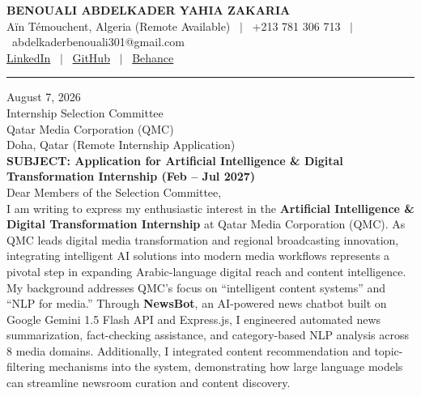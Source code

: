 \documentclass[11pt, letterpaper]{article}
\begin{document}
\RaggedRight

\begin{center}
  {\Large \textbf{BENOUALI ABDELKADER YAHIA ZAKARIA}}\\[4pt]
  Aïn Témouchent, Algeria (Remote Available) \ $|$ \ +213 781 306 713 \ $|$ \ abdelkaderbenouali301@gmail.com\\
  \href{https://www.linkedin.com/in/benouali-abdelkader-yahia-zakaria-4a917a247}{LinkedIn} \ $|$ \ \href{https://github.com/benoualiabdelkader}{GitHub} \ $|$ \ \href{https://www.behance.net/abdelkaderbeno}{Behance}
\end{center}

\vspace{6pt}
\hrule
\vspace{14pt}

\noindent August 7, 2026\\[10pt]
\noindent Internship Selection Committee\\
\noindent Qatar Media Corporation (QMC)\\
\noindent Doha, Qatar (Remote Internship Application)\\[12pt]

\noindent \textbf{SUBJECT: Application for Artificial Intelligence \& Digital Transformation Internship (Feb -- Jul 2027)}\\[12pt]

\noindent Dear Members of the Selection Committee,\\[10pt]

I am writing to express my enthusiastic interest in the \textbf{Artificial Intelligence \& Digital Transformation Internship} at Qatar Media Corporation (QMC). As QMC leads digital media transformation and regional broadcasting innovation, integrating intelligent AI solutions into modern media workflows represents a pivotal step in expanding Arabic-language digital reach and content intelligence.\\[10pt]

My background addresses QMC's focus on ``intelligent content systems'' and ``NLP for media.'' Through \textbf{NewsBot}, an AI-powered news chatbot built on Google Gemini 1.5 Flash API and Express.js, I engineered automated news summarization, fact-checking assistance, and category-based NLP analysis across 8 media domains. Additionally, I integrated content recommendation and topic-filtering mechanisms into the system, demonstrating how large language models can streamline newsroom curation and content discovery.\\[10pt]
\end{document}
